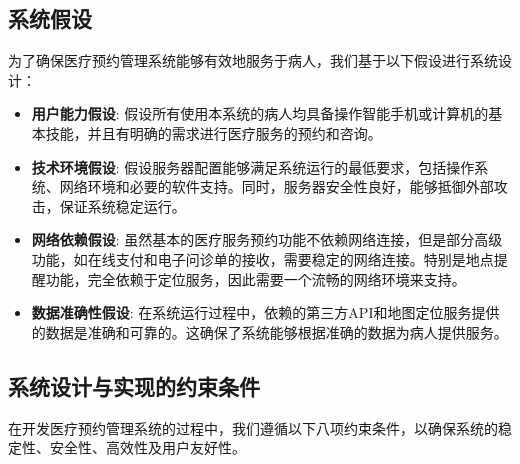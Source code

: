 \subsection{系统假设}
为了确保医疗预约管理系统能够有效地服务于病人，我们基于以下假设进行系统设计：

\begin{itemize}
	\item \textbf{用户能力假设}: 假设所有使用本系统的病人均具备操作智能手机或计算机的基本技能，并且有明确的需求进行医疗服务的预约和咨询。
	\item \textbf{技术环境假设}: 假设服务器配置能够满足系统运行的最低要求，包括操作系统、网络环境和必要的软件支持。同时，服务器安全性良好，能够抵御外部攻击，保证系统稳定运行。
	\item \textbf{网络依赖假设}: 虽然基本的医疗服务预约功能不依赖网络连接，但是部分高级功能，如在线支付和电子问诊单的接收，需要稳定的网络连接。特别是地点提醒功能，完全依赖于定位服务，因此需要一个流畅的网络环境来支持。
	\item \textbf{数据准确性假设}: 在系统运行过程中，依赖的第三方API和地图定位服务提供的数据是准确和可靠的。这确保了系统能够根据准确的数据为病人提供服务。
\end{itemize}

\subsection{系统设计与实现的约束条件}

在开发医疗预约管理系统的过程中，我们遵循以下八项约束条件，以确保系统的稳定性、安全性、高效性及用户友好性。

